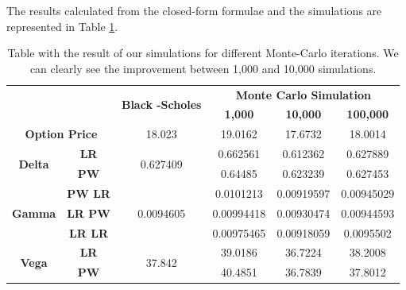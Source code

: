 \documentclass[11pt,a4paper,fleqn,draft]{article}
\begin{document}
The results calculated from the closed-form formulae and the simulations are represented in Table \ref{tab:euroresults}.


\begin{table}[h!]
\centering
\begin{tabular}{|c|c|c|c|c|c|}
\hline
\multicolumn{2}{|c|}{\multirow{2}{*}{}}          & \multirow{2}{*}{\textbf{Black -Scholes}} & \multicolumn{3}{c|}{\textbf{Monte Carlo Simulation}} \\ \cline{4-6}
\multicolumn{2}{|c|}{}                           &                                          & \textbf{1,000}  & \textbf{10,000} & \textbf{100,000} \\ \hline
\multicolumn{2}{|c|}{\textbf{Option Price}}      & 18.023                                   & 19.0162         & 17.6732         & 18.0014          \\ \hline
\multirow{2}{*}{\textbf{Delta}} & \textbf{LR}    & \multirow{2}{*}{0.627409}                & 0.662561        & 0.612362        & 0.627889         \\ \cline{2-2} \cline{4-6}
                                & \textbf{PW}    &                                          & 0.64485         & 0.623239        & 0.627453         \\ \hline
\multirow{3}{*}{\textbf{Gamma}} & \textbf{PW LR} & \multirow{3}{*}{0.0094605}               & 0.0101213       & 0.00919597      & 0.00945029       \\ \cline{2-2} \cline{4-6}
                                & \textbf{LR PW} &                                          & 0.00994418      & 0.00930474      & 0.00944593       \\ \cline{2-2} \cline{4-6}
                                & \textbf{LR LR} &                                          & 0.00975465      & 0.00918059      & 0.0095502        \\ \hline
\multirow{2}{*}{\textbf{Vega}}  & \textbf{LR}    & \multirow{2}{*}{37.842}                  & 39.0186         & 36.7224         & 38.2008          \\ \cline{2-2} \cline{4-6}
                                & \textbf{PW}    &                                          & 40.4851         & 36.7839         & 37.8012          \\ \hline
\end{tabular}
\caption{\label{tab:euroresults}Table with the result of our simulations for different Monte-Carlo iterations. We can clearly see the improvement between 1,000 and 10,000 simulations.}
\end{table}
\end{document}
